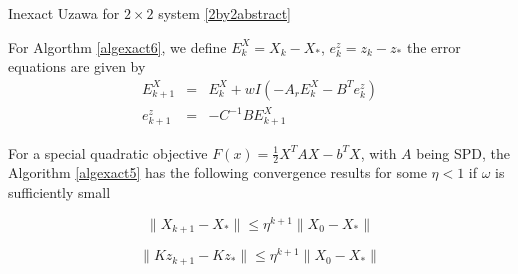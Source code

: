 \begin{algorithm}
\caption{Inexact Uzawa for $2 \times 2$ system \eqref{2by2abstract} }
\label{algexact6}
\begin{algorithmic}
\EndFor
\end{algorithmic}
\end{algorithm}

For Algorthm \ref{algexact6}, we define $E^X_{k} = X_k - X_*$, $e^z_{k} = z_k - z_*$ the error equations are given by 
\begin{eqnarray}
E^X_{k+1} &=& E^X_{k} + wI\left( -A_rE^X_{k} - B^Te^z_k \right) \label{erroreqn1}\\
e^z_{k+1} &=& -C^{-1}B E^X_{k+1} \label{erroreqn2}
\end{eqnarray}
    
\begin{theorem}
For a special quadratic objective $F(x) = \frac{1}{2} X^T A X - b^TX$, with $A$ being SPD, the Algorithm \ref{algexact5} has the following convergence results for some $\eta<1$ if $\omega$ is sufficiently small

\begin{equation}
    \|X_{k+1} - X_*\| \leq \eta^{k+1} \|X_{0} - X_* \| 
\end{equation}

\begin{equation}
    \|Kz_{k+1} - K z_*\| \leq \eta^{k+1} \|X_{0} - X_* \| 
\end{equation}
\end{theorem}

